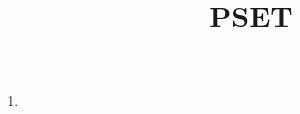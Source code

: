 \documentclass{article}
\title{PSET}
\date{}
\begin{document}
\maketitle

\begin{enumerate}
	\item
\end{enumerate}
\end{document}

